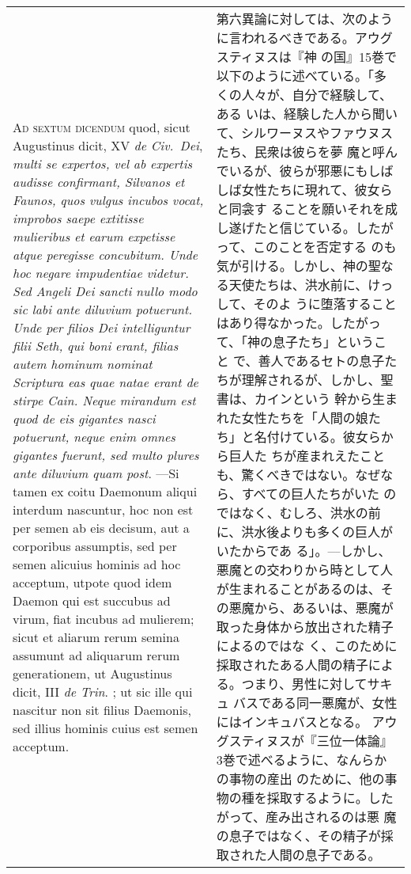 \documentclass[10pt]{jsarticle} %
\begin{document}
\begin{longtable}{p{21em}p{21em}}
{\scshape Ad sextum dicendum} quod, sicut Augustinus
dicit, XV {\itshape de Civ.~Dei}, {\itshape multi se expertos, vel ab expertis audisse
confirmant, Silvanos et Faunos, quos vulgus incubos vocat, improbos
saepe extitisse mulieribus et earum expetisse atque peregisse
concubitum. Unde hoc negare impudentiae videtur. Sed Angeli Dei sancti
nullo modo sic labi ante diluvium potuerunt. Unde per filios Dei
intelliguntur filii Seth, qui boni erant, filias autem hominum nominat
Scriptura eas quae natae erant de stirpe Cain. Neque mirandum est quod
de eis gigantes nasci potuerunt, neque enim omnes gigantes fuerunt, sed
multo plures ante diluvium quam post}. ---Si tamen ex coitu Daemonum aliqui
interdum nascuntur, hoc non est per semen ab eis decisum, aut a
corporibus assumptis, sed per semen alicuius hominis ad hoc acceptum,
utpote quod idem Daemon qui est succubus ad virum, fiat incubus ad
mulierem; sicut et aliarum rerum semina assumunt ad aliquarum rerum
generationem, ut Augustinus dicit, III {\itshape de Trin}. ; ut sic ille qui
nascitur non sit filius Daemonis, sed illius hominis cuius est semen
acceptum.

&

第六異論に対しては、次のように言われるべきである。アウグスティヌスは『神
の国』15巻で以下のように述べている。「多くの人々が、自分で経験して、ある
いは、経験した人から聞いて、シルワーヌスやファウヌスたち、民衆は彼らを夢
魔と呼んでいるが、彼らが邪悪にもしばしば女性たちに現れて、彼女らと同衾す
ることを願いそれを成し遂げたと信じている。したがって、このことを否定する
のも気が引ける。しかし、神の聖なる天使たちは、洪水前に、けっして、そのよ
うに堕落することはあり得なかった。したがって、「神の息子たち」ということ
で、善人であるセトの息子たちが理解されるが、しかし、聖書は、カインという
幹から生まれた女性たちを「人間の娘たち」と名付けている。彼女らから巨人た
ちが産まれえたことも、驚くべきではない。なぜなら、すべての巨人たちがいた
のではなく、むしろ、洪水の前に、洪水後よりも多くの巨人がいたからであ
る」。---しかし、悪魔との交わりから時として人が生まれることがあるのは、そ
 の悪魔から、あるいは、悪魔が取った身体から放出された精子によるのではな
 く、このために採取されたある人間の精子による。つまり、男性に対してサキュ
 バスである同一悪魔が、女性にはインキュバスとなる。
 アウグスティヌスが『三位一体論』3巻で述べるように、なんらかの事物の産出
 のために、他の事物の種を採取するように。したがって、産み出されるのは悪
 魔の息子ではなく、その精子が採取された人間の息子である。



\end{longtable}
\end{document}

